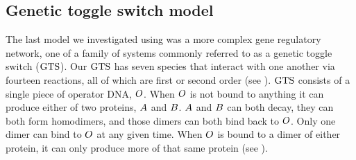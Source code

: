 \subsection{Genetic toggle switch model}
\label{sec:gts}
The last model we investigated using  was a more complex gene regulatory network, one of a family of systems commonly referred to as a genetic toggle switch ($\text{GTS}$)\supercite{Gardner:2000bm}. Our $\text{GTS}$ has seven species that interact with one another via fourteen reactions, all of which are first or second order (see ). $\text{GTS}$ consists of a single piece of operator DNA, $O$. When $O$ is not bound to anything it can produce either of two proteins, $A$ and $B$. $A$ and $B$ can both decay, they can both form homodimers, and those dimers can both bind back to $O$. Only one dimer can bind to $O$ at any given time. When $O$ is bound to a dimer of either protein, it can only produce more of that same protein (see ).

